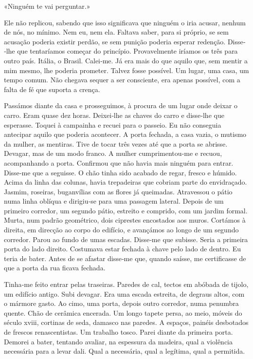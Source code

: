 «Ninguém te vai perguntar.»

Ele não replicou, sabendo que isso significava que ninguém o iria
acusar, nenhum de nós, no mínimo. Nem eu, nem ela. Faltava saber, para
si próprio, se sem acusação poderia existir perdão, se sem punição
poderia esperar redenção. Disse­‑lhe que tentaríamos começar do
princípio. Provavelmente iríamos os três para outro país. Itália, o
Brasil. Calei­‑me. Já era mais do que aquilo que, sem mentir a mim
mesmo, lhe poderia prometer. Talvez fosse possível. Um lugar, uma casa,
um tempo comum. Não chegava sequer a ser consciente, era apenas
possível, com a falta de fé que suporta a crença.

Passámos diante da casa e prosseguimos, à procura de um lugar onde
deixar o carro. Eram quase dez horas. Deixei­‑lhe as chaves do carro e
disse­‑lhe que esperasse. Toquei à campainha e recuei para o passeio. Eu
não conseguia antecipar aquilo que poderia acontecer. A porta fechada, a
casa vazia, o mutismo da mulher, as mentiras. Tive de tocar três vezes
até que a porta se abrisse. Devagar, mas de um modo franco. A mulher
cumprimentou­‑me e recuou, acompanhando a porta. Confirmou que não havia
mais ninguém para entrar. Disse­‑me que a seguisse. O chão tinha sido
acabado de regar, fresco e húmido. Acima da linha das colunas, havia
trepadeiras que cobriam parte do envidraçado. Jasmim, roseiras,
buganvílias com as flores já queimadas. Atravessou o pátio numa linha
oblíqua e dirigiu­‑se para uma passagem lateral. Depois de um primeiro
corredor, um segundo pátio, estreito e comprido, com um jardim formal.
Murta, num padrão geométrico, dois ciprestes encostados aos muros.
Cortámos à direita, em direcção ao corpo do edifício, e avançámos ao
longo de um segundo corredor. Parou ao fundo de umas escadas. Disse­‑me
que subisse. Seria a primeira porta do lado direito. Costumava estar
fechada à chave pelo lado de dentro. Eu teria de bater. Antes de se
afastar disse­‑me que, quando saísse, me certificasse de que a porta da
rua ficava fechada.

Tinha­‑me feito entrar pelas traseiras. Paredes de cal, tectos em
abóbada de tijolo, um edifício antigo. Subi devagar. Era uma escada
estreita, de degraus altos, com o mármore gasto. Ao cimo, uma porta,
depois outro corredor, numa penumbra quente. Chão de cerâmica encerada.
Um longo tapete persa, ao meio, móveis do século xviii, cortinas de
seda, damasco nas paredes. A espaços, painéis desbotados de frescos
renascentistas. Um trabalho tosco. Parei diante da primeira porta.
Demorei a bater, tentando avaliar, na espessura da madeira, qual a
violência necessária para a levar dali. Qual a necessária, qual a
legítima, qual a permitida.

